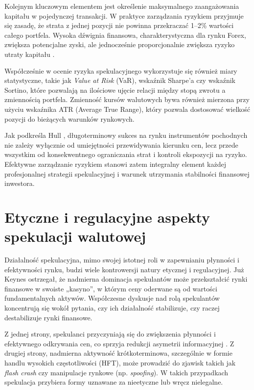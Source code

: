Kolejnym kluczowym elementem jest określenie maksymalnego zaangażowania kapitału w pojedynczej transakcji. 
W praktyce zarządzania ryzykiem przyjmuje się zasadę, że strata z jednej pozycji nie powinna przekraczać 1–2\% wartości całego portfela. 
Wysoka dźwignia finansowa, charakterystyczna dla rynku Forex, zwiększa potencjalne zyski, ale jednocześnie proporcjonalnie zwiększa ryzyko utraty kapitału \parencite{mishkin2019}. 

Współcześnie w ocenie ryzyka spekulacyjnego wykorzystuje się również miary statystyczne, takie jak \emph{Value at Risk} (VaR), wskaźnik Sharpe’a czy wskaźnik Sortino, 
które pozwalają na ilościowe ujęcie relacji między stopą zwrotu a zmiennością portfela. 
Zmienność kursów walutowych bywa również mierzona przy użyciu wskaźnika ATR (Average True Range), który pozwala dostosować wielkość pozycji do bieżących warunków rynkowych.

Jak podkreśla Hull \parencite{hull2018}, długoterminowy sukces na rynku instrumentów pochodnych nie zależy wyłącznie od umiejętności przewidywania kierunku cen, 
lecz przede wszystkim od konsekwentnego ograniczania strat i kontroli ekspozycji na ryzyko. 
Efektywne zarządzanie ryzykiem stanowi zatem integralny element każdej profesjonalnej strategii spekulacyjnej i warunek utrzymania stabilności finansowej inwestora.


\section{Etyczne i regulacyjne aspekty spekulacji walutowej}

Działalność spekulacyjna, mimo swojej istotnej roli w zapewnianiu płynności i efektywności rynku, budzi wiele kontrowersji natury etycznej i regulacyjnej. 
Już Keynes \parencite{keynes1936} ostrzegał, że nadmierna dominacja spekulantów może przekształcić rynki finansowe w swoiste „kasyno”, w którym ceny oderwane są od wartości fundamentalnych aktywów. 
Współczesne dyskusje nad rolą spekulantów koncentrują się wokół pytania, czy ich działalność stabilizuje, czy raczej destabilizuje rynki finansowe.

Z jednej strony, spekulanci przyczyniają się do zwiększenia płynności i efektywnego odkrywania cen, co sprzyja redukcji asymetrii informacyjnej \parencite{shleifer2000}. 
Z drugiej strony, nadmierna aktywność krótkoterminowa, szczególnie w formie handlu wysokich częstotliwości (HFT), może prowadzić do zjawisk takich jak \emph{flash crash} czy manipulacje rynkowe (np. \emph{spoofing}). 
W takich przypadkach spekulacja przybiera formy uznawane za nieetyczne lub wręcz nielegalne.

